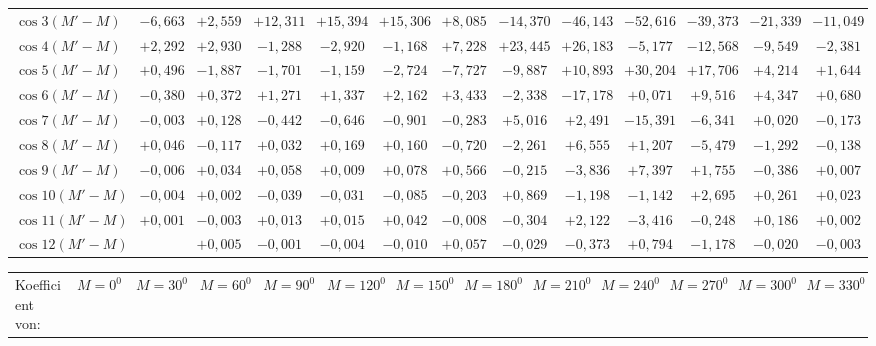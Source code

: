 \begin{landscape}
\begin{longtable}{@{}l|r|r|r|r|r|r|r|r|r|r|r|r@{}}
\(\cos 3(M'-M)\) & \(-6{,}663\) & \(+2{,}559\) & \(+12{,}311\) & \(+15{,}394\) & \(+15{,}306\) & \(+8{,}085\) & \(-14{,}370\) & \(-46{,}143\) & \(-52{,}616\) & \(-39{,}373\) & \(-21{,}339\) & \(-11{,}049\)\\
\(\cos 4(M'-M)\) & \(+2{,}292\) & \(+2{,}930\) & \(-1{,}288\) & \(-2{,}920\) & \(-1{,}168\) & \(+7{,}228\) & \(+23{,}445\) & \(+26{,}183\) & \(-5{,}177\) & \(-12{,}568\) & \(-9{,}549\) & \(-2{,}381\)\\
\(\cos 5(M'-M)\) & \(+0{,}496\) & \(-1{,}887\) & \(-1{,}701\) & \(-1{,}159\) & \(-2{,}724\) & \(-7{,}727\) & \(-9{,}887\) & \(+10{,}893\) & \(+30{,}204\) & \(+17{,}706\) & \(+4{,}214\) & \(+1{,}644\)\\
\(\cos 6(M'-M)\) & \(-0{,}380\) & \(+0{,}372\) & \(+1{,}271\) & \(+1{,}337\) & \(+2{,}162\) & \(+3{,}433\) & \(-2{,}338\) & \(-17{,}178\) & \(+0{,}071\) & \(+9{,}516\) & \(+4{,}347\) & \(+0{,}680\)\\
\(\cos 7(M'-M)\) & \(-0{,}003\) & \(+0{,}128\) & \(-0{,}442\) & \(-0{,}646\) & \(-0{,}901\) & \(-0{,}283\) & \(+5{,}016\) & \(+2{,}491\) & \(-15{,}391\) & \(-6{,}341\) & \(+0{,}020\) & \(-0{,}173\)\\
\(\cos 8(M'-M)\) & \(+0{,}046\) & \(-0{,}117\) & \(+0{,}032\) & \(+0{,}169\) & \(+0{,}160\) & \(-0{,}720\) & \(-2{,}261\) & \(+6{,}555\) & \(+1{,}207\) & \(-5{,}479\) & \(-1{,}292\) & \(-0{,}138\)\\
\(\cos 9(M'-M)\) & \(-0{,}006\) & \(+0{,}034\) & \(+0{,}058\) & \(+0{,}009\) & \(+0{,}078\) & \(+0{,}566\) & \(-0{,}215\) & \(-3{,}836\) & \(+7{,}397\) & \(+1{,}755\) & \(-0{,}386\) & \(+0{,}007\)\\
\(\cos 10(M'-M)\) & \(-0{,}004\) & \(+0{,}002\) & \(-0{,}039\) & \(-0{,}031\) & \(-0{,}085\) & \(-0{,}203\) & \(+0{,}869\) & \(-1{,}198\) & \(-1{,}142\) & \(+2{,}695\) & \(+0{,}261\) & \(+0{,}023\)\\
\(\cos 11(M'-M)\) & \(+0{,}001\) & \(-0{,}003\) & \(+0{,}013\) & \(+0{,}015\) & \(+0{,}042\) & \(-0{,}008\) & \(-0{,}304\) & \(+2{,}122\) & \(-3{,}416\) & \(-0{,}248\) & \(+0{,}186\) & \(+0{,}002\)\\
\(\cos 12(M'-M)\) &  & \(+0{,}005\) & \(-0{,}001\) & \(-0{,}004\) & \(-0{,}010\) & \(+0{,}057\) & \(-0{,}029\) & \(-0{,}373\) & \(+0{,}794\) & \(-1{,}178\) & \(-0{,}020\) & \(-0{,}003\)\\
\end{longtable}
\clearpage
{}
\begin{longtable}{@{}l|r|r|r|r|r|r|r|r|r|r|r|r@{}}
\hline
\shortstack{Koefficient\\von:} & \(M=0^0\) & \(M=30^0\) & \(M=60^0\) & \(M=90^0\) & \(M=120^0\) & \(M=150^0\) & \(M=180^0\) & \(M=210^0\) & \(M=240^0\) & \(M=270^0\) & \(M=300^0\) & \(M=330^0\)\\

\end{longtable}
\end{landscape}

